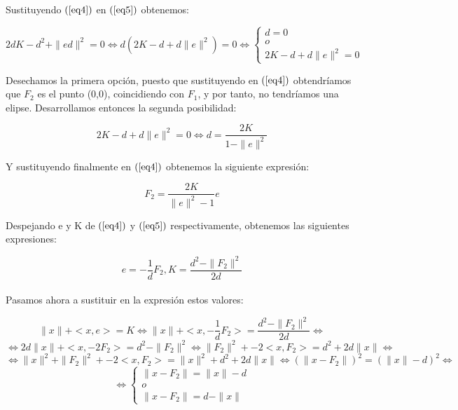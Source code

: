 \documentclass[12pt]{article}
\begin{document}
Sustituyendo $(\ref{eq4})$ en $(\ref{eq5})$ obtenemos:



$$2dK -d^2 + \|ed\|^2 = 0 \Leftrightarrow d(2K - d + d\|e\|^2) = 0 \Leftrightarrow
 \left\{
 \begin{array}{ll}
                  d = 0\\
                  o\\
                  2K - d + d\|e\|^2 = 0
                \end{array}
              \right.$$


Desechamos la primera opción, puesto que sustituyendo en $(\ref{eq4})$ obtendríamos que $F_2$ es el punto (0,0), coincidiendo con $F_1$, y por tanto, no tendríamos una elipse. Desarrollamos entonces la segunda posibilidad:

\begin{equation}2K - d + d\|e\|^2 = 0 \Leftrightarrow d = \frac{2K}{1 - \|e\|^2}  \label{eq6}\end{equation}


Y sustituyendo finalmente en $(\ref{eq4})$ obtenemos la siguiente expresión: 


\begin{equation} F_2 =  \frac{2K}{\|e\|^2 - 1} e  \label{eq7}\end{equation}


Despejando e y K de $(\ref{eq4})$ y $(\ref{eq5})$ respectivamente, obtenemos las siguientes expresiones:

\begin{equation}e = -\frac{1}{d}F_2, K=\frac{d^2-\|F_2\|^2}{2d}  \label{eq8}\end{equation}\\

Pasamos ahora a sustituir en la expresión estos valores:

$$\|x\| +  <x,e> = K \Leftrightarrow  \|x\| +  <x,-\frac{1}{d}F_2> = \frac{d^2-\|F_2\|^2}{2d}  \Leftrightarrow $$
$$\Leftrightarrow 2d\|x\| +  <x,-2F_2> = d^2-\|F_2\|^2 \Leftrightarrow \|F_2\|^2  +  -2<x,F_2> = d^2 + 2d\|x\|\Leftrightarrow $$
$$\Leftrightarrow \|x\|^2 + \|F_2\|^2  +  -2<x,F_2> = \|x\|^2 + d^2 + 2d\|x\|\Leftrightarrow (\|x - F_2\|)^2   = (\|x\|- d)^2\Leftrightarrow$$
$$ \Leftrightarrow\left\{
 \begin{array}{ll}
                  \|x - F_2\|   = \|x\|- d\\
                  o\\
                  \|x - F_2\|   = d - \|x\|
                \end{array}
              \right.$$\\
\end{document}
